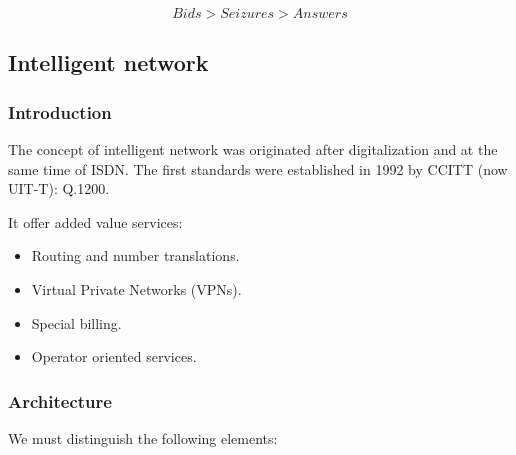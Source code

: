 \documentclass[
	12pt,
	twoside
]{book}
\begin{document}
$$
	Bids > Seizures > Answers
$$

\subsection{Intelligent network}

\subsubsection{Introduction}

The concept of intelligent network was originated after digitalization and at the same time of ISDN. The first standards were established in 1992 by CCITT (now UIT-T): Q.1200.

It offer added value services:

\begin{itemize}
	\item Routing and number translations.
	\item Virtual Private Networks (VPNs).
	\item Special billing.
	\item Operator oriented services.
\end{itemize}

\subsubsection{Architecture}

We must distinguish the following elements:
\end{document}
